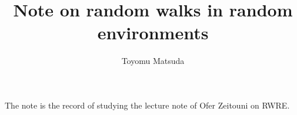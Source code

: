 \documentclass[12pt]{article}
\title{\TitleFont Note on random walks in random environments }
\author{Toyomu Matsuda}
\date{}
\begin{document}
\maketitle

The note is the record of studying the lecture note of Ofer Zeitouni on RWRE.

\end{document}
